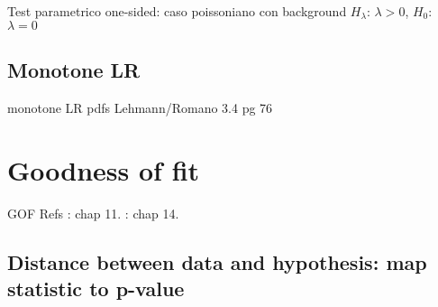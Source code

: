 \begin{frame}{Test parametrico one-sided: caso poissoniano con background}
$H_{\lambda}$: $\lambda>0$, $H_0$: $\lambda=0$
\end{frame}

\subsection{Monotone LR}

\begin{frame}{monotone LR pdfs}
Lehmann/Romano 3.4 pg 76
\end{frame}

\section{Goodness of fit}

\begin{wordonframe}{GOF Refs}
\cite{james2006statistical}: chap 11. \cite{lehmann2006testing}: chap 14.

\end{wordonframe}

\subsection{Distance between data and hypothesis: map statistic to p-value}

